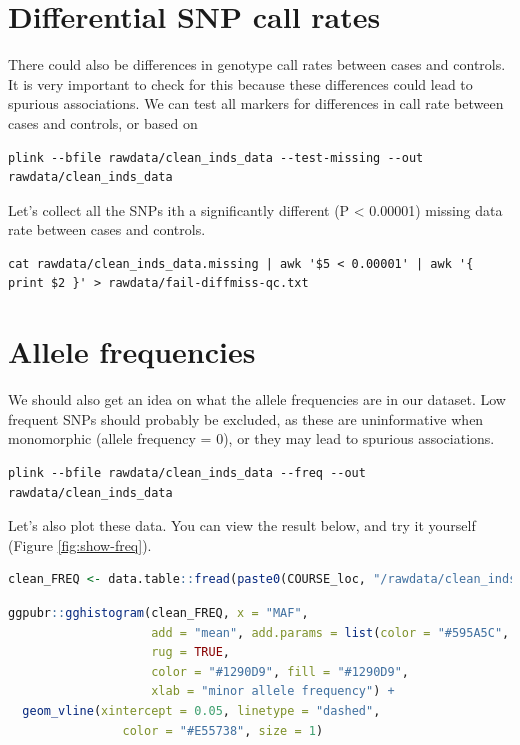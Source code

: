 \documentclass[
]{book}
\begin{document}
\hypertarget{differential-snp-call-rates}{%
\section{Differential SNP call rates}\label{differential-snp-call-rates}}

There could also be differences in genotype call rates between cases and controls. It is very important to check for this because these differences could lead to spurious associations. We can test all markers for differences in call rate between cases and controls, or based on

\begin{lstlisting}
plink --bfile rawdata/clean_inds_data --test-missing --out rawdata/clean_inds_data
\end{lstlisting}

Let's collect all the SNPs ith a significantly different (P \textless{} 0.00001) missing data rate between cases and controls.

\begin{lstlisting}
cat rawdata/clean_inds_data.missing | awk '$5 < 0.00001' | awk '{ print $2 }' > rawdata/fail-diffmiss-qc.txt
\end{lstlisting}

\hypertarget{allele-frequencies}{%
\section{Allele frequencies}\label{allele-frequencies}}

We should also get an idea on what the allele frequencies are in our dataset. Low frequent SNPs should probably be excluded, as these are uninformative when monomorphic (allele frequency = 0), or they may lead to spurious associations.

\begin{lstlisting}
plink --bfile rawdata/clean_inds_data --freq --out rawdata/clean_inds_data
\end{lstlisting}

Let's also plot these data. You can view the result below, and try it yourself (Figure \ref{fig:show-freq}).

\begin{lstlisting}[language=R]
clean_FREQ <- data.table::fread(paste0(COURSE_loc, "/rawdata/clean_inds_data.frq"))
\end{lstlisting}

\begin{lstlisting}[language=R]
ggpubr::gghistogram(clean_FREQ, x = "MAF",
                    add = "mean", add.params = list(color = "#595A5C", linetype = "dashed", size = 1),
                    rug = TRUE,
                    color = "#1290D9", fill = "#1290D9",
                    xlab = "minor allele frequency") +
  geom_vline(xintercept = 0.05, linetype = "dashed",
                color = "#E55738", size = 1)
\end{lstlisting}
\end{document}
